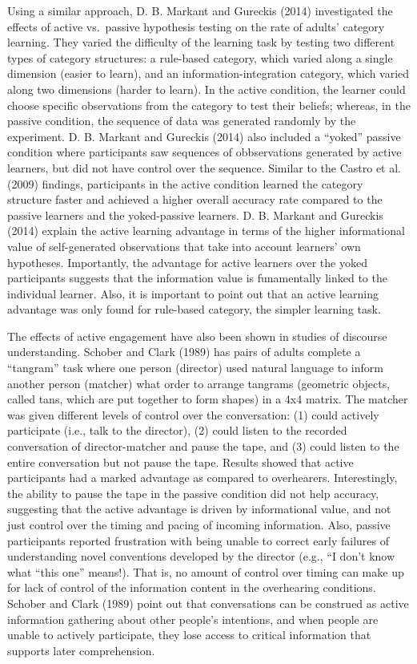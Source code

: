 \documentclass[english,floatsintext,man]{apa6}
\theoremstyle{definition}
\theoremstyle{definition}
\theoremstyle{definition}
\theoremstyle{remark}
\begin{document}
Using a similar approach, D. B. Markant and Gureckis (2014) investigated
the effects of active vs.~passive hypothesis testing on the rate of
adults' category learning. They varied the difficulty of the learning
task by testing two different types of category structures: a rule-based
category, which varied along a single dimension (easier to learn), and
an information-integration category, which varied along two dimensions
(harder to learn). In the active condition, the learner could choose
specific observations from the category to test their beliefs; whereas,
in the passive condition, the sequence of data was generated randomly by
the experiment. D. B. Markant and Gureckis (2014) also included a
\enquote{yoked} passive condition where participants saw sequences of
obbservations generated by active learners, but did not have control
over the sequence. Similar to the Castro et al. (2009) findings,
participants in the active condition learned the category structure
faster and achieved a higher overall accuracy rate compared to the
passive learners and the yoked-passive learners. D. B. Markant and
Gureckis (2014) explain the active learning advantage in terms of the
higher informational value of self-generated observations that take into
account learners' own hypotheses. Importantly, the advantage for active
learners over the yoked participants suggests that the information value
is funamentally linked to the individual learner. Also, it is important
to point out that an active learning advantage was only found for
rule-based category, the simpler learning task.

The effects of active engagement have also been shown in studies of
discourse understanding. Schober and Clark (1989) has pairs of adults
complete a \enquote{tangram} task where one person (director) used
natural language to inform another person (matcher) what order to
arrange tangrams (geometric objects, called tans, which are put together
to form shapes) in a 4x4 matrix. The matcher was given different levels
of control over the conversation: (1) could actively participate (i.e.,
talk to the director), (2) could listen to the recorded conversation of
director-matcher and pause the tape, and (3) could listen to the entire
conversation but not pause the tape. Results showed that active
participants had a marked advantage as compared to overhearers.
Interestingly, the ability to pause the tape in the passive condition
did not help accuracy, suggesting that the active advantage is driven by
informational value, and not just control over the timing and pacing of
incoming information. Also, passive participants reported frustration
with being unable to correct early failures of understanding novel
conventions developed by the director (e.g., ``I don't know what
\enquote{this one} means!). That is, no amount of control over timing
can make up for lack of control of the information content in the
overhearing conditions. Schober and Clark (1989) point out that
conversations can be construed as active information gathering about
other people's intentions, and when people are unable to actively
participate, they lose access to critical information that supports
later comprehension.
\end{document}

